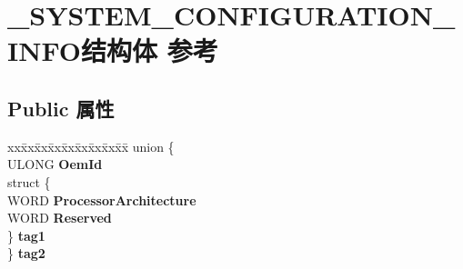 \hypertarget{struct___s_y_s_t_e_m___c_o_n_f_i_g_u_r_a_t_i_o_n___i_n_f_o}{}\section{\+\_\+\+S\+Y\+S\+T\+E\+M\+\_\+\+C\+O\+N\+F\+I\+G\+U\+R\+A\+T\+I\+O\+N\+\_\+\+I\+N\+F\+O结构体 参考}
\label{struct___s_y_s_t_e_m___c_o_n_f_i_g_u_r_a_t_i_o_n___i_n_f_o}
\subsection*{Public 属性}
\begin{DoxyCompactItemize}
\item 
\mbox{\label{struct___s_y_s_t_e_m___c_o_n_f_i_g_u_r_a_t_i_o_n___i_n_f_o_a679b4e3842bac981ff6b9b55880c0260}} 
\begin{tabbing}
xx\=xx\=xx\=xx\=xx\=xx\=xx\=xx\=xx\=\kill
union \{\\
\>ULONG {\bfseries OemId}\\
\>struct \{\\
\>\>WORD {\bfseries ProcessorArchitecture}\\
\>\>WORD {\bfseries Reserved}\\
\>\} {\bfseries tag1}\\
\} {\bfseries tag2}\\


\end{tabbing}
\end{DoxyCompactItemize}
